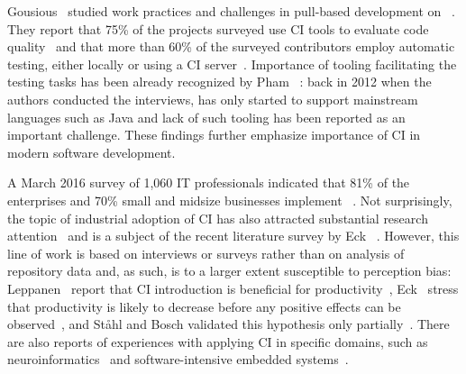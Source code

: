 
Gousious \etal\ studied work practices and challenges in pull-based
development on \GH~\cite{gousios2015work, gousios2016work}. 
They report that 75\% of the projects surveyed use CI tools to evaluate
code quality~\cite{gousios2015work} and that more than 60\% of the surveyed 
contributors employ automatic testing, either locally or using a CI server~\cite{gousios2016work}. 
Importance of tooling facilitating the testing tasks has been already recognized by 
Pham \etal~\cite{pham2013creating}: back in 2012 when the authors conducted
the interviews, \Tvis has only started to support mainstream languages such as Java 
and lack of such tooling has been reported as an important challenge.
These findings further emphasize importance of CI in modern software development. 

A March 2016 survey of 1,060 IT professionals indicated that 81\% of the enterprises 
and 70\% small and midsize businesses implement \DO~\cite{rightscale}. 
Not surprisingly, the topic of industrial adoption of CI 
has also attracted substantial research attention~\cite{hilton2016continuous,Leppanen2015,Laukkanen2015Agile,Debbiche2014,Stahl2014ICSEComp,Stahl2014JSS,Stahl2013Experienced} and is a subject of the recent literature survey by Eck \etal~\cite{EckUB14}. 
However, this line of work is based on interviews or surveys rather than on 
analysis of repository data and, as such, is to a larger extent susceptible to 
perception bias: \eg Leppanen \etal\ report that
CI introduction is beneficial for productivity~\cite{Leppanen2015}, 
Eck \etal\ stress that productivity is likely to decrease before any positive effects can be observed~\cite{EckUB14},
and St{\aa}hl and Bosch validated this hypothesis only partially~\cite{Stahl2013Experienced}.
%
There are also reports of experiences with applying CI in specific domains,
such as neuroinformatics~\cite{Zaytsev:Morrison} and software-intensive
embedded systems~\cite{Martensson2016}.

